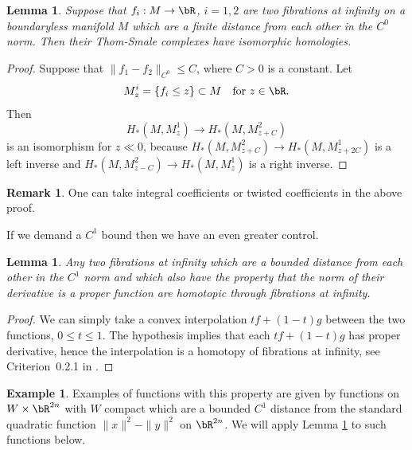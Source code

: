 \documentclass[JEP,XML,SOM,Unicode,NoFloatCountersInSection]{cedram}
\theoremstyle{plain}
\newtheorem{lemma}[theorem]{Lemma}
\theoremstyle{definition}
\newtheorem{remark}[theorem]{Remark}
\newtheorem{example}[theorem]{Example}
\begin{document}
\begin{lemma}\label{Lemma: bars}
Suppose that $f_i:M \to \bR$, $i=1,2$ are two fibrations at infinity on a boundaryless manifold $M$ which are a finite distance from each other in the $C^0$ norm. Then their Thom-Smale complexes have isomorphic homologies.
\end{lemma}
\begin{proof}
Suppose that $\|f_1-f_2\|_{C^0} \leq C$, where $C>0$ is a constant. Let
\[
M^i_z=\{f_i \leq z \} \subset M\quad\text{for }z \in \bR.
\]
Then
\[
H_*(M,M^1_z) \to H_*(M,M^2_{z+C})
\]
is an isomorphism for $z \ll 0$, because $H_*(M,M^2_{z+C}) \to H_*(M,M^1_{z+2C})$ is a left inverse and $H_*(M,M^2_{z-C}) \to H_*(M,M^1_z)$ is a right inverse. \end{proof}

\begin{remark} One can take integral coefficients or twisted coefficients in the above proof. \end{remark}

If we demand a $C^1$ bound then we have an even greater control.

\begin{lemma}\label{lemma: we need C1}
Any two fibrations at infinity which are a bounded distance from each other in the $C^1$ norm and which also have the property that the norm of their derivative is a proper function are homotopic through fibrations at infinity.
\end{lemma}

\begin{proof}
We can simply take a convex interpolation $tf+(1-t)g$ between the two functions, $0 \leq t \leq 1$. The hypothesis implies that each $tf+(1-t)g$ has proper derivative, hence the interpolation is a homotopy of fibrations at infinity, see Criterion~0.2.1 in \cite{EG98}.
\end{proof}

\begin{example}\label{ex: standard quadratic}
Examples of functions with this property are given by functions on $W\times \bR^{2n}$ with $W$ compact which are a bounded $C^1$ distance from the standard quadratic function $\|x\|^2-\|y\|^2$ on $\bR^{2n}$. We will apply Lemma \ref{lemma: we need C1} to such functions below.
\end{example}
\end{document}
